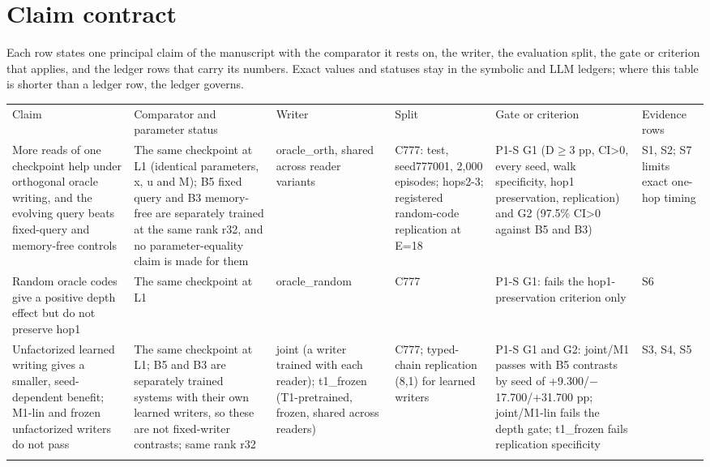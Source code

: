 \section{Claim contract}\label{app:C}
\begin{landscape}

Each row states one principal claim of the manuscript with the comparator it rests on, the
writer, the evaluation split, the gate or criterion that applies, and the ledger rows that
carry its numbers. Exact values and statuses stay in the symbolic and
LLM ledgers; where this table is shorter than a ledger row, the ledger governs.


{\footnotesize
\setlength{\tabcolsep}{3pt}
\begin{longtable}{W{209}{12}W{209}{12}W{148}{12}W{185}{12}W{209}{12}W{40}{12}}
\toprule
Claim & Comparator and parameter status & Writer & Split & Gate or criterion & Evidence rows \\ \addlinespace[3pt]
\midrule \endhead
More reads of one checkpoint help under orthogonal oracle writing, and the evolving query beats fixed-query and memory-free controls & The same checkpoint at L1 (identical parameters, x, u and M); B5 fixed query and B3 memory-free are separately trained at the same rank r32, and no parameter-equality claim is made for them & oracle\_orth, shared across reader variants & C777: test, seed777001, 2,000 episodes; hops2-3; registered random-code replication at E=18 & P1-S G1 (D\ensuremath{\geq}3 pp, CI>0, every seed, walk specificity, hop1 preservation, replication) and G2 (97.5\% CI>0 against B5 and B3) & S1, S2; S7 limits exact one-hop timing \\ \addlinespace[3pt]  %
Random oracle codes give a positive depth effect but do not preserve hop1 & The same checkpoint at L1 & oracle\_random & C777 & P1-S G1: fails the hop1-preservation criterion only & S6 \\ \addlinespace[3pt]  %
Unfactorized learned writing gives a smaller, seed-dependent benefit; M1-lin and frozen unfactorized writers do not pass & The same checkpoint at L1; B5 and B3 are separately trained systems with their own learned writers, so these are not fixed-writer contrasts; same rank r32 & joint (a writer trained with each reader); t1\_frozen (T1-pretrained, frozen, shared across readers) & C777; typed-chain replication (8,1) for learned writers & P1-S G1 and G2: joint/\allowbreak{}M1 passes with B5 contrasts by seed of +9.300/\allowbreak{}\ensuremath{-}17.700/\allowbreak{}+31.700 pp; joint/\allowbreak{}M1-lin fails the depth gate; t1\_frozen fails replication specificity & S3, S4, S5 \\ \addlinespace[3pt]  %

\end{longtable}}
\end{landscape}
